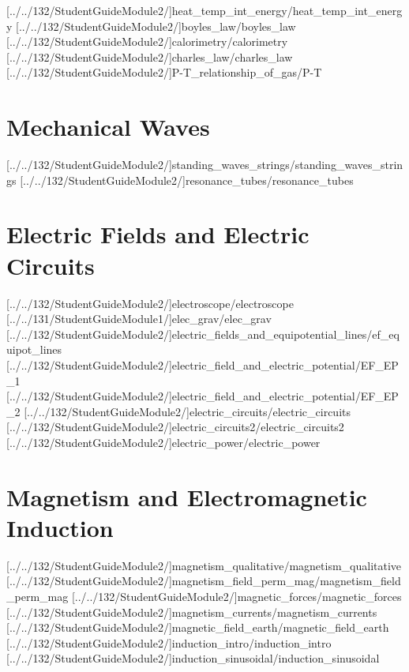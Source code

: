 \documentclass[english,twoside]{article}
\begin{document}
[../../132/StudentGuideModule2/]{heat_temp_int_energy/heat_temp_int_energy}
[../../132/StudentGuideModule2/]{boyles_law/boyles_law}
[../../132/StudentGuideModule2/]{calorimetry/calorimetry}
[../../132/StudentGuideModule2/]{charles_law/charles_law}
[../../132/StudentGuideModule2/]{P-T_relationship_of_gas/P-T}

\part{Mechanical Waves}
[../../132/StudentGuideModule2/]{standing_waves_strings/standing_waves_strings} %
[../../132/StudentGuideModule2/]{resonance_tubes/resonance_tubes} 

\part{Electric Fields and Electric Circuits}

[../../132/StudentGuideModule2/]{electroscope/electroscope}
[../../131/StudentGuideModule1/]{elec_grav/elec_grav}
[../../132/StudentGuideModule2/]{electric_fields_and_equipotential_lines/ef_equipot_lines}
[../../132/StudentGuideModule2/]{electric_field_and_electric_potential/EF_EP_1}
[../../132/StudentGuideModule2/]{electric_field_and_electric_potential/EF_EP_2}
[../../132/StudentGuideModule2/]{electric_circuits/electric_circuits}
[../../132/StudentGuideModule2/]{electric_circuits2/electric_circuits2}
[../../132/StudentGuideModule2/]{electric_power/electric_power}

\part{Magnetism and Electromagnetic Induction}

[../../132/StudentGuideModule2/]{magnetism_qualitative/magnetism_qualitative}
[../../132/StudentGuideModule2/]{magnetism_field_perm_mag/magnetism_field_perm_mag}
[../../132/StudentGuideModule2/]{magnetic_forces/magnetic_forces} 
[../../132/StudentGuideModule2/]{magnetism_currents/magnetism_currents} %
[../../132/StudentGuideModule2/]{magnetic_field_earth/magnetic_field_earth}
[../../132/StudentGuideModule2/]{induction_intro/induction_intro}
[../../132/StudentGuideModule2/]{induction_sinusoidal/induction_sinusoidal} %
\end{document}

